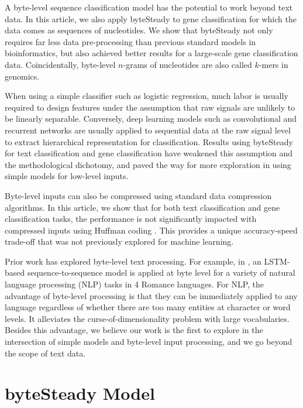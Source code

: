 \documentclass{article}
\begin{document}
A byte-level sequence classification model has the potential to work beyond text data. In this article, we also apply byteSteady to gene classification for which the data comes as sequences of nucleotides. We show that byteSteady not only requires far less data pre-processing than previous standard models in bioinformatics, but also achieved better results for a large-scale gene classification data. Coincidentally, byte-level \(n\)-grams of nucleotides are also called \(k\)-mers in genomics.

When using a simple classifier such as logistic regression, much labor is usually required to design features under the assumption that raw signals are unlikely to be linearly separable. Conversely, deep learning models such as convolutional and recurrent networks are usually applied to sequential data at the raw signal level to extract hierarchical representation for classification. Results using byteSteady for text classification and gene classification have weakened this assumption and the methodological dichotomy, and paved the way for more exploration in using simple models for low-level inputs.

Byte-level inputs can also be compressed using standard data compression algorithms. In this article, we show that for both text classification and gene classification tasks, the performance is not significantly impacted with compressed inputs using Huffman coding \cite{H52}. This provides a unique accuracy-speed trade-off that was not previously explored for machine learning.

Prior work has explored byte-level text processing. For example, in \cite{GBVS16}, an LSTM-based \cite{HS97} sequence-to-sequence \cite{CMGBBSB14} \cite{SVL14} model is applied at byte level for a variety of natural language processing (NLP) tasks in 4 Romance languages. For NLP, the advantage of byte-level processing is that they can be immediately applied to any language regardless of whether there are too many entities at character or word levels. It alleviates the curse-of-dimensionality problem \cite{BDVJ03} with large vocabularies. Besides this advantage, we believe our work is the first to explore in the intersection of simple models and byte-level input processing, and we go beyond the scope of text data.

\section{byteSteady Model}
\end{document}
